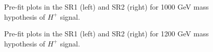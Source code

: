 \begin{figure}[H]
  \centering
  \caption{Pre-fit plots in the SR1 (left) and SR2 (right) for 1000 GeV mass hypothesis of $H^{+}$ signal.}
  \label{fig:Prefit_Hp1000_Asimov}
\end{figure}
\begin{figure}[H]
  \centering
  \caption{Pre-fit plots in the SR1 (left) and SR2 (right) for 1200 GeV mass hypothesis of $H^{+}$ signal.}
  \label{fig:Prefit_Hp1200_Asimov}
\end{figure}
